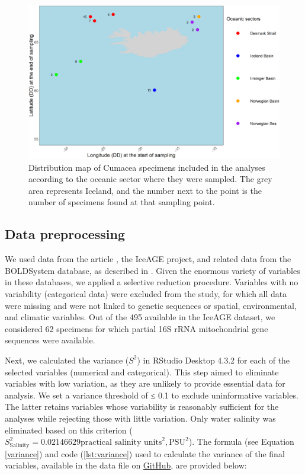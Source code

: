 \begin{figure}[htbp]
    \centering
    \includegraphics[width=\textwidth]{figuremap.png}
    \caption{Distribution map of Cumacea specimens included in the analyses according to the oceanic sector where they were sampled. The grey area represents Iceland, and the number next to the point is the number of specimens found at that sampling point. \label{fig:fig2}}
\end{figure}

\subsection{Data preprocessing}
We used data from the article \citep{uhlir_adding_2021}, the IceAGE project, and related data from the BOLDSystem database, as described in \citep{uhlir_adding_2021}. Given the enormous variety of variables in these databases, we applied a selective reduction procedure. Variables with no variability (categorical data) were excluded from the study, for which all data were missing and were not linked to genetic sequences or spatial, environmental, and climatic variables. Out of the 495 available in the IceAGE dataset, we considered 62 specimens for which partial 16S rRNA mitochondrial gene sequences were available.

Next, we calculated the variance ($S^2$) in RStudio Desktop 4.3.2 for each of the selected variables (numerical and categorical). This step aimed to eliminate variables with low variation, as they are unlikely to provide essential data for analysis. We set a variance threshold of ≤ 0.1 to exclude uninformative variables. The latter retains variables whose variability is reasonably sufficient for the analyses while rejecting those with little variation. Only water salinity was eliminated based on this criterion ($S^2_\text{Salinity} = 0.02146629 \text{practical salinity units}^2, \text{PSU}^2$). The formula (see Equation \ref{variance}) and code (\autoref{lst:variance}) used to calculate the variance of the final variables, available in the data file on \href{https://github.com/tahiri-lab/Cumacea_aPhyloGeo}{GitHub}, are provided below:


